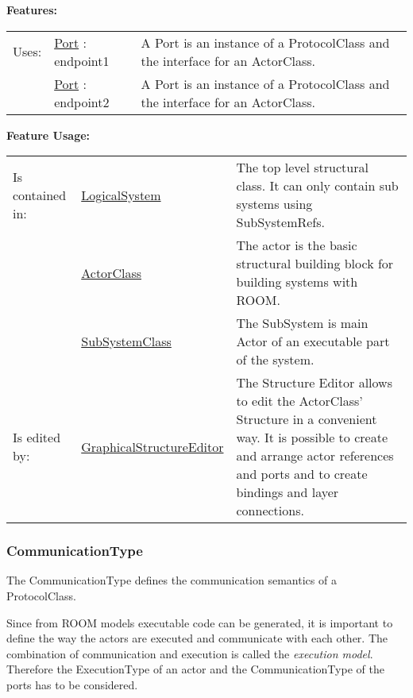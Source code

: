		
	\begingroup
	\textbf{Features:}
	\renewcommand{\arraystretch}{1.8} %
	\begin{longtable}{l|l p{}}
		\hline
	Uses: & \tabitem \hyperlink{ref:Port}{Port} : endpoint1 & A Port is an instance of a ProtocolClass and the interface for an ActorClass.\\
	& \tabitem \hyperlink{ref:Port}{Port} : endpoint2 & A Port is an instance of a ProtocolClass and the interface for an ActorClass. \\
	\hline
	\end{longtable}
	\endgroup
		
	\begingroup
	\textbf{Feature Usage:}
	\renewcommand{\arraystretch}{1.8} %
	\begin{longtable}{l|l p{}}
		\hline
	Is contained in: & \tabitem \hyperlink{ref:LogicalSystem}{LogicalSystem}  & The top level structural class. It can only contain sub systems using SubSystemRefs.\\
	& \tabitem \hyperlink{ref:ActorClass}{ActorClass}  & The actor is the basic structural building block for building systems with ROOM. \\
	& \tabitem \hyperlink{ref:SubSystemClass}{SubSystemClass}  & The SubSystem is main Actor of an executable part of the system.  \\
	\hline
	Is edited by: & \tabitem \hyperlink{ref:GraphicalStructureEditor}{GraphicalStructureEditor}  & The Structure Editor allows to edit the ActorClass' Structure in a convenient way. It is possible to create and arrange actor references and ports and to create bindings and layer connections.\\
	\hline
	\end{longtable}
	\endgroup
		
	
	\vspace{\baselineskip}
	\vspace{\baselineskip}
	\vspace{\baselineskip}
	
\subsubsection{CommunicationType}
	\hypertarget{ref:CommunicationType}{}
	The CommunicationType defines the communication semantics of a ProtocolClass.
		
	Since from ROOM models executable code can be generated, it is important to define the way the actors are 
	executed and communicate with each other. The combination of communication and execution is called the 
	\emph{execution model}. Therefore the ExecutionType of an actor and the CommunicationType of the ports has to be considered.
	
